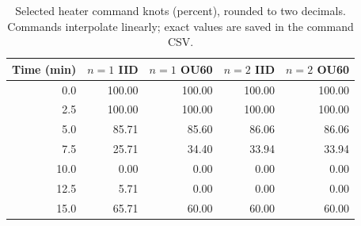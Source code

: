 \begin{table}[htbp]
\centering
\small
\caption{Selected heater command knots (percent), rounded to two decimals. Commands interpolate linearly; exact values are saved in the command CSV.}
\label{tab:teaching-commands}
\begin{tabular}{rrrrr}
\toprule
Time (min) & $n=1$ IID & $n=1$ OU60 & $n=2$ IID & $n=2$ OU60 \\
\midrule
0.0 & 100.00 & 100.00 & 100.00 & 100.00 \\
2.5 & 100.00 & 100.00 & 100.00 & 100.00 \\
5.0 & 85.71 & 85.60 & 86.06 & 86.06 \\
7.5 & 25.71 & 34.40 & 33.94 & 33.94 \\
10.0 & 0.00 & 0.00 & 0.00 & 0.00 \\
12.5 & 5.71 & 0.00 & 0.00 & 0.00 \\
15.0 & 65.71 & 60.00 & 60.00 & 60.00 \\
\bottomrule
\end{tabular}
\end{table}
